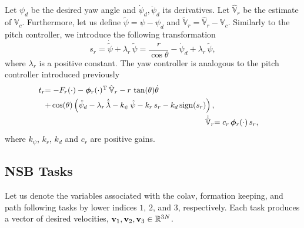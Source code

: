 Let $\psi_d$ be the desired yaw angle and $\dot{\psi}_d, \ddot{\psi}_d$ its derivatives.
Let $\hat{\mathbb{V}}_r$ be the estimate of $\mathbb{V}_c$.
Furthermore, let us define $\tilde{\psi} = \psi - \psi_d$ and $\tilde{\mathbb{V}}_r = \hat{\mathbb{V}}_r - \mathbb{V}_c$.
Similarly to the pitch controller, we introduce the following transformation
\begin{equation}
    s_r = \dot{\tilde{\psi}} + \lambda_r\,\tilde{\psi} = \frac{r}{\cos\theta} - \dot{\psi}_d + \lambda_r\,\tilde{\psi},
\end{equation}
where $\lambda_r$ is a positive constant.
The yaw controller is analogous to the pitch controller introduced previously
\begin{align}        
    \begin{split}
        \scale[0.95]{t_r} &\scale[0.95]{= - F_r(\cdot) - \bs{\phi}_r(\cdot)\T\,\hat{\mathbb{V}}_r - r\,\tan(\theta)\dot{\theta}} \\
        & \scale[0.95]{ + \cos(\theta)\left(\ddot{\psi}_d - \lambda_r\,\dot{\tilde{\lambda}} - k_{\psi}\,\tilde{\psi} - k_r\,s_r - k_d\,{\rm sign}(s_r)\right), }
    \end{split} \label{eq:nsb_5dof_t_r} \\
    \scale[0.95]{\dot{\hat{\mathbb{V}}}_r} & \scale[0.95]{= c_r\,\bs{\phi}_r(\cdot)\,s_r,} \label{eq:nsb_5dof_V_hat_r}
\end{align}
where $k_{\psi}$, $k_r$, $k_d$ and $c_r$ are positive gains.

\subsection{NSB Tasks}
\label{sec:nsb_5dof_NSB}
Let us denote the variables associated with the \gls{colav}, formation keeping, and path following tasks by lower indices $1$, $2$, and $3$, respectively.
Each task produces a vector of desired velocities, $\mathbf{v}_{1}, \mathbf{v}_{2}, \mathbf{v}_{3} \in \mathbb{R}^{3N}$.

